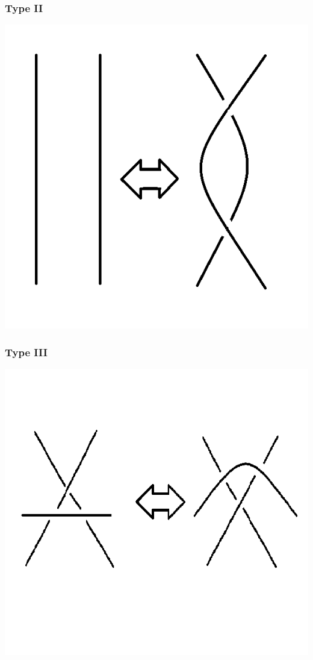 \documentclass{beamer}
\begin{document}
\begin{frame}
  \frametitle{Type II}
  \begin{center}
    \includegraphics[scale=.4]{t2}
  \end{center}
\end{frame}

\begin{frame}
  \frametitle{Type III}
  \begin{center}
    \includegraphics[scale=.6]{t3}
  \end{center}
\end{frame}
\end{document}
